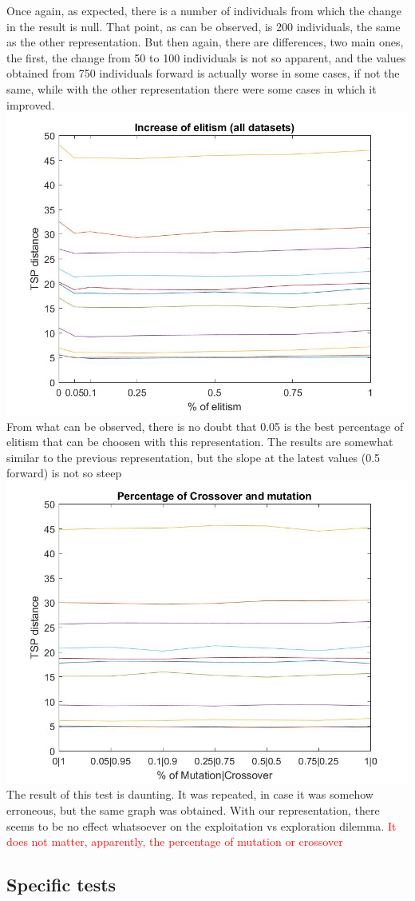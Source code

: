 Once again, as expected, there is a number of individuals from which the
change in the result is null. That point, as can be observed, is 200
individuals, the same as the other representation. But then again, there
are differences, two main ones, the first, the change from 50 to 100
individuals is not so apparent, and the values obtained from 750
individuals forward is actually worse in some cases, if not the same, while
with the other representation there were some cases in which it
improved. \\
\includegraphics[width=\textwidth]{img/order_crossover/elitism.jpg}\\
From what can be observed, there is no doubt that 0.05 is the best
percentage of elitism that can be choosen with this representation. The results
are somewhat similar to the previous representation, but the slope at the
latest values (0.5 forward) is not so steep\\
\includegraphics[width=\textwidth]{img/order_crossover/crossMut.jpg}\\
The result of this test is daunting. It was repeated, in case it was somehow
erroneous, but the same graph was obtained. With our representation, there
seems to be no effect whatsoever on the exploitation vs exploration dilemma.
\textcolor{red}{It does not matter, apparently, the percentage of mutation
or crossover}
\\


\subsection{Specific tests}


